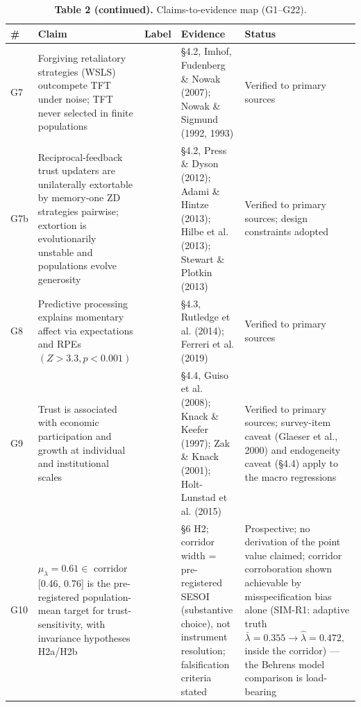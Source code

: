 \documentclass[11pt,twocolumn]{article}
\theoremstyle{gttdef}
\theoremstyle{gttplain}
\begin{document}
\begin{table}[!tb]
\centering\footnotesize
\caption*{\textbf{Table 2 (continued).} Claims-to-evidence map (G1--G22).}
\setlength{\tabcolsep}{4pt}
\begin{tabular}{@{}>{\raggedright\arraybackslash}p{}>{\raggedright\arraybackslash}p{}>{\raggedright\arraybackslash}p{}>{\raggedright\arraybackslash}p{}>{\raggedright\arraybackslash}p{}@{}}
\toprule
\textbf{\#} & \textbf{Claim} & \textbf{Label} & \textbf{Evidence} & \textbf{Status} \\
\midrule
G7 & Forgiving retaliatory strategies (WSLS) outcompete TFT under noise; TFT never selected in finite populations & [EMPIRICAL] & \S{}4.2, Imhof, Fudenberg \& Nowak (2007); Nowak \& Sigmund (1992, 1993) & Verified to primary sources \\
\addlinespace[3pt]
G7b & Reciprocal-feedback trust updaters are unilaterally extortable by memory-one ZD strategies pairwise; extortion is evolutionarily unstable and populations evolve generosity & [EMPIRICAL] & \S{}4.2, Press \& Dyson (2012); Adami \& Hintze (2013); Hilbe et al. (2013); Stewart \& Plotkin (2013) & Verified to primary sources; design constraints adopted \\
\addlinespace[3pt]
G8 & Predictive processing explains momentary affect via expectations and RPEs $(Z > 3.3, p < 0.001)$ & [EMPIRICAL] & \S{}4.3, Rutledge et al. (2014); Ferreri et al. (2019) & Verified to primary sources \\
\addlinespace[3pt]
G9 & Trust is associated with economic participation and growth at individual and institutional scales & [EMPIRICAL] & \S{}4.4, Guiso et al. (2008); Knack \& Keefer (1997); Zak \& Knack (2001); Holt-Lunstad et al. (2015) & Verified to primary sources; survey-item caveat (Glaeser et al., 2000) and endogeneity caveat (\S{}4.4) apply to the macro regressions \\
\addlinespace[3pt]
G10 & $\mu_\lambda = 0.61 \in$ corridor [0.46, 0.76] is the pre-registered population-mean target for trust-sensitivity, with invariance hypotheses H2a/H2b & [HYPOTHESIS] & \S{}6 H2; corridor width = pre-registered SESOI (substantive choice), not instrument resolution; falsification criteria stated & Prospective; no derivation of the point value claimed; corridor corroboration shown achievable by misspecification bias alone (SIM-R1: adaptive truth $\bar{\lambda} = 0.355 \to \hat{\lambda} = 0.472,$ inside the corridor) --- the Behrens model comparison is load-bearing \\

\end{tabular}
\end{table}
\end{document}
